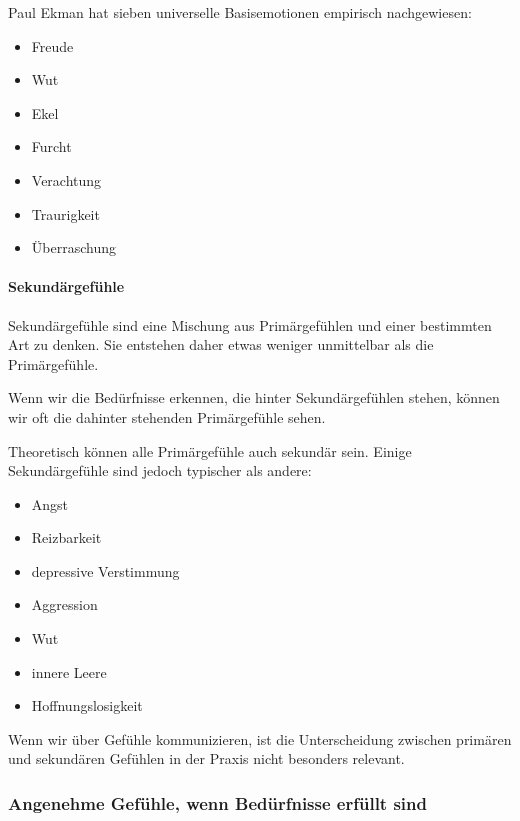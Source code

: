 Paul Ekman\cite{ekman-emotions} hat sieben universelle Basisemotionen empirisch nachgewiesen:

\begin{itemize}
  \item Freude
  \item Wut
  \item Ekel
  \item Furcht
  \item Verachtung
  \item Traurigkeit
  \item Überraschung
\end{itemize}

\paragraph{Sekundärgefühle}

Sekundärgefühle sind eine Mischung aus Primärgefühlen und einer bestimmten Art zu denken. Sie entstehen daher etwas weniger unmittelbar als die Primärgefühle.

Wenn wir die Bedürfnisse erkennen, die hinter Sekundärgefühlen stehen, können wir oft die dahinter stehenden Primärgefühle sehen.

Theoretisch können alle Primärgefühle auch sekundär sein. Einige Sekundärgefühle sind jedoch typischer als andere:

\begin{itemize}
 \item Angst
 \item Reizbarkeit
 \item depressive Verstimmung
 \item Aggression
 \item Wut
 \item innere Leere
 \item Hoffnungslosigkeit
\end{itemize}

Wenn wir über Gefühle kommunizieren, ist die Unterscheidung zwischen primären und sekundären Gefühlen in der Praxis nicht besonders relevant.

\subsubsection{Angenehme Gefühle, wenn Bedürfnisse erfüllt sind}

